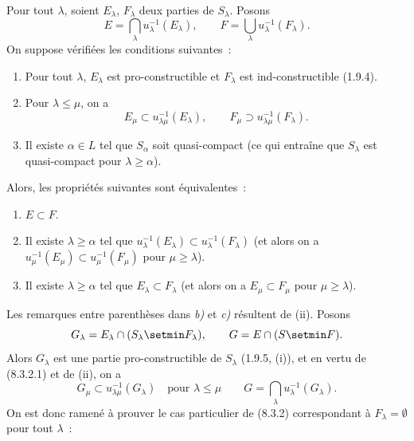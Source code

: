 \begin{theorem}[8.3.2]
\label{IV.8.3.2-fr}
Pour tout $\lambda$, soient $E_\lambda$, $F_\lambda$ deux parties de
$S_\lambda$. Posons
\begin{equation}
E=\bigcap_\lambda u_\lambda^{-1}(E_\lambda),\qquad
F=\bigcup_\lambda u_\lambda^{-1}(F_\lambda).
\tag{8.3.2.1}\label{IV.8.3.2.1-fr}
\end{equation}
On suppose vérifiées les conditions suivantes~:
\begin{enumerate}
\item[\textup{(i)}] Pour tout $\lambda$, $E_\lambda$ est pro-constructible et
$F_\lambda$ est ind-constructible \textup{(1.9.4)}.
\item[\textup{(ii)}] Pour $\lambda\leq\mu$, on a
\[
E_\mu\subset u_{\lambda\mu}^{-1}(E_\lambda),\qquad
F_\mu\supset u_{\lambda\mu}^{-1}(F_\lambda).
\]
\item[\textup{(iii)}] Il existe $\alpha\in L$ tel que $S_\alpha$ soit quasi-compact
\textup{(ce qui entraîne que $S_\lambda$ est quasi-compact pour
$\lambda\geq\alpha$)}.
\end{enumerate}
Alors, les propriétés suivantes sont équivalentes~:
\begin{enumerate}
\item[\emph{a)}] $E\subset F$.
\item[\emph{b)}] Il existe $\lambda\geq\alpha$ tel que
$u_\lambda^{-1}(E_\lambda)\subset u_\lambda^{-1}(F_\lambda)$ \textup{(et alors on a
$u_\mu^{-1}(E_\mu)\subset u_\mu^{-1}(F_\mu)$ pour $\mu\geq\lambda$)}.
\item[\emph{c)}] Il existe $\lambda\geq\alpha$ tel que
$E_\lambda\subset F_\lambda$ \textup{(et alors on a $E_\mu\subset F_\mu$ pour
$\mu\geq\lambda$)}.
\end{enumerate}
\end{theorem}

Les remarques entre parenthèses dans \emph{b)} et \emph{c)} résultent de (ii).
Posons
\[
G_\lambda=E_\lambda\cap(S_\lambda\setmin F_\lambda),\qquad
G=E\cap(S\setmin F).
\]
Alors $G_\lambda$ est une partie pro-constructible de $S_\lambda$ (1.9.5,
(i)), et en vertu de (8.3.2.1) et de (ii), on a
\[
G_\mu\subset u_{\lambda\mu}^{-1}(G_\lambda)
\quad\text{pour }\lambda\leq\mu
\qquad
G=\bigcap_\lambda u_\lambda^{-1}(G_\lambda).
\]
On est donc ramené à prouver le cas particulier de (8.3.2) correspondant à
$F_\lambda=\emptyset$ pour tout $\lambda$~:

